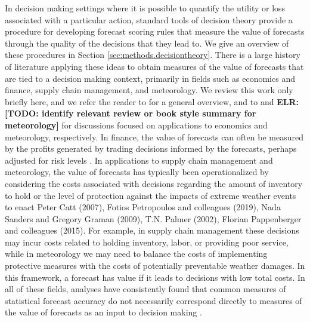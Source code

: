 \documentclass{article}
\def\elr#1{{\color{cyan}\textbf{ELR:[#1]}}}
\begin{document}
In decision making settings where it is possible to quantify the utility or loss associated with a particular action, standard tools of decision theory provide a procedure for developing forecast scoring rules that measure the value of forecasts through the quality of the decisions that they lead to. We give an overview of these procedures in Section \ref{sec:methods.decisiontheory}. There is a large history of literature applying these ideas to obtain measures of the value of forecasts that are tied to a decision making context, primarily in fields such as economics and finance, supply chain management, and meteorology. We review this work only briefly here, and we refer the reader to \cite{yardley2021utility_cost_forecasts} for a general overview, and to \cite{pesaran2002decision_based_eval} and \elr{TODO: identify relevant review or book style summary for meteorology} for discussions focused on applications to economics and meteorology, respectively. In finance, the value of forecasts can often be measured by the profits generated by trading decisions informed by the forecasts, perhaps adjusted for risk levels \cite[e.g.,][]{leitch1991economicForecastEval, cenesizoglu2012returnPredictionEconValue}. In applications to supply chain management and meteorology, the value of forecasts has typically been operationalized by considering the costs associated with decisions regarding the amount of inventory to hold or the level of protection against the impacts of extreme weather events to enact {Peter Catt (2007), Fotios Petropoulos and colleagues (2019), Nada Sanders and Gregory Graman (2009), T.N. Palmer (2002), Florian Pappenberger and colleagues (2015)}. For example, in supply chain management these decisions may incur costs related to holding inventory, labor, or providing poor service, while in meteorology we may need to balance the costs of implementing protective measures with the costs of potentially preventable weather damages. In this framework, a forecast has value if it leads to decisions with low total costs. In all of these fields, analyses have consistently found that common measures of statistical forecast accuracy do not necessarily correspond directly to measures of the value of forecasts as an input to decision making \cite[e.g.,][]{leitch1991economicForecastEval, cenesizoglu2012returnPredictionEconValue}. %

\end{document}
